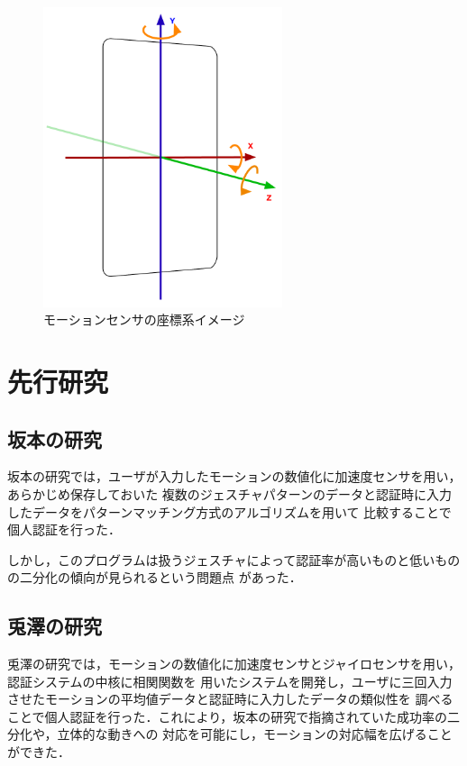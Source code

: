 \documentclass[11pt]{jreport}
\begin{document}
    \begin{figure}[htbp]
      \begin{center}
        \includegraphics[width=7cm, bb=0 0 373 469]{SmartphoneSensor.pdf}
        \caption{モーションセンサの座標系イメージ}
        \label{sensor}
      \end{center}
    \end{figure}

\chapter{先行研究}
	\section{坂本の研究}
	坂本の研究では，ユーザが入力したモーションの数値化に加速度センサを用い，あらかじめ保存しておいた
    複数のジェスチャパターンのデータと認証時に入力したデータをパターンマッチング方式のアルゴリズムを用いて
    比較することで個人認証を行った．

    しかし，このプログラムは扱うジェスチャによって認証率が高いものと低いものの二分化の傾向が見られるという問題点
    があった．
	\section{兎澤の研究}
    兎澤の研究では，モーションの数値化に加速度センサとジャイロセンサを用い，認証システムの中核に相関関数を
    用いたシステムを開発し，ユーザに三回入力させたモーションの平均値データと認証時に入力したデータの類似性を
    調べることで個人認証を行った．これにより，坂本の研究で指摘されていた成功率の二分化や，立体的な動きへの
    対応を可能にし，モーションの対応幅を広げることができた．
\end{document}
